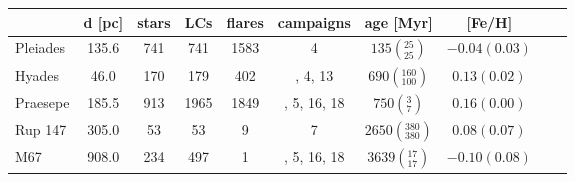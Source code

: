 \begin{tabular}{lccccccccr}
\hline
          &  d [pc] &  stars &   LCs &  flares &    campaigns &                        age [Myr] &         [Fe/H] \\
\hline
 Pleiades &   135.6 &    741 &   741 &    1583 &            4 &     $135\left(_{25}^{25}\right)$ &  $-0.04(0.03)$ \\
   Hyades &    46.0 &    170 &   179 &     402 &      , 4, 13 &   $690\left(_{100}^{160}\right)$ &   $0.13(0.02)$ \\
 Praesepe &   185.5 &    913 &  1965 &    1849 &  , 5, 16, 18 &       $750\left(_{7}^{3}\right)$ &   $0.16(0.00)$ \\
  Rup 147 &   305.0 &     53 &    53 &       9 &            7 &  $2650\left(_{380}^{380}\right)$ &   $0.08(0.07)$ \\
      M67 &   908.0 &    234 &   497 &       1 &  , 5, 16, 18 &    $3639\left(_{17}^{17}\right)$ &  $-0.10(0.08)$ \\
\hline

\end{tabular}
